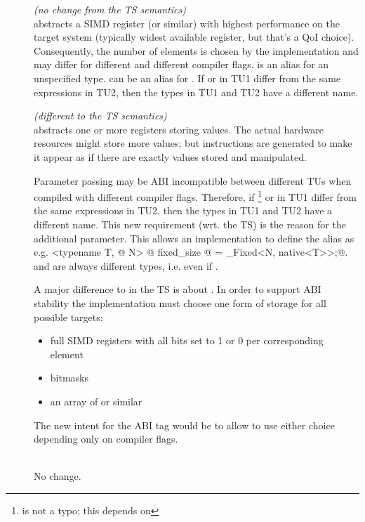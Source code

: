 \begin{description}
  \item[] \emph{(no change from the TS semantics)}\\
     abstracts a SIMD register (or similar) with highest performance on the target system (typically widest available register, but that's a QoI choice).
    Consequently, the number of elements is chosen by the implementation and may differ for different  and different compiler flags.
    \simdabi{} is an alias for an unspecified type.
    \simdabi{} can be an alias for \simdabi{}.
    If  or  in TU1 differ from the same expressions in TU2, then the types  in TU1 and TU2 have a different name.

  \item[] \emph{(different to the TS semantics)}\\
     abstracts one or more registers storing  values.
    The actual hardware resources might store more values; but instructions are generated to make it appear as if there are exactly  values stored and manipulated.

    Parameter passing may be ABI incompatible between different TUs when compiled with different compiler flags.
    Therefore, if %
    \footnote{ is not a typo; this depends on \simdabi{}}
    or  in TU1
    differ from the same expressions in TU2, then the types  in TU1
    and TU2 have a different name.
    This new requirement (wrt. the TS) is the reason for the additional
     parameter.
    This allows an implementation to define the  alias as e.g.
    \lstinline@template <typename T, @
    \lstinline@int N> @
    \lstinline@using fixed_size @
    \lstinline@= _Fixed<N, native<T>>;@.
     and  are always different types, i.e. even if .

    A major difference to \stdx\simdabi{} in the TS is about .
    In order to support ABI stability the  implementation must choose one form of storage for all possible targets:
    \begin{itemize}
      \item full SIMD registers with all bits set to 1 or 0 per corresponding element
      \item bitmasks
      \item an array of  or similar
    \end{itemize}
    The new intent for the  ABI tag would be to allow  to use either choice depending only on compiler flags.

  \item[]\ \\
    No change.
\end{description}

